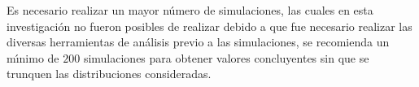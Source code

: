 Es necesario realizar un mayor n\'umero de simulaciones, las cuales en esta investigaci\'on no fueron posibles de realizar debido a que fue necesario realizar las diversas herramientas de an\'alisis previo a las simulaciones, se recomienda un m\'{\i}nimo de $200$ simulaciones para obtener valores concluyentes sin que se trunquen las distribuciones consideradas.

